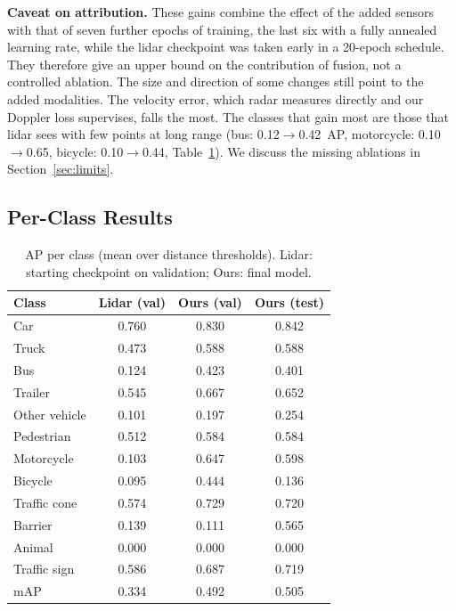 \documentclass[conference]{IEEEtran}
\begin{document}
\textbf{Caveat on attribution.} These gains combine the effect of the added sensors with that of seven further
epochs of training, the last six with a fully annealed learning rate, while the lidar checkpoint was taken early in a
20-epoch schedule. They therefore give an upper bound on the contribution of fusion, not a controlled ablation. The
size and direction of some changes still point to the added modalities. The velocity error, which radar measures
directly and our Doppler loss supervises, falls the most. The classes that gain most are those that lidar sees with
few points at long range (bus: 0.12$\rightarrow$0.42~AP, motorcycle: 0.10$\rightarrow$0.65, bicycle:
0.10$\rightarrow$0.44, Table~\ref{tab:class}). We discuss the missing ablations in Section~\ref{sec:limits}.

\subsection{Per-Class Results}

\begin{table}[t]
\centering
\caption{AP per class (mean over distance thresholds). Lidar: starting checkpoint on validation; Ours: final model.}
\label{tab:class}
\setlength{\tabcolsep}{4pt}
\begin{tabular}{lccc}
\toprule
Class & Lidar (val) & Ours (val) & Ours (test) \\
\midrule
Car            & 0.760 & 0.830 & 0.842 \\
Truck          & 0.473 & 0.588 & 0.588 \\
Bus            & 0.124 & 0.423 & 0.401 \\
Trailer        & 0.545 & 0.667 & 0.652 \\
Other vehicle  & 0.101 & 0.197 & 0.254 \\
Pedestrian     & 0.512 & 0.584 & 0.584 \\
Motorcycle     & 0.103 & 0.647 & 0.598 \\
Bicycle        & 0.095 & 0.444 & 0.136 \\
Traffic cone   & 0.574 & 0.729 & 0.720 \\
Barrier        & 0.139 & 0.111 & 0.565 \\
Animal         & 0.000 & 0.000 & 0.000 \\
Traffic sign   & 0.586 & 0.687 & 0.719 \\
\midrule
mAP            & 0.334 & 0.492 & 0.505 \\
\bottomrule
\end{tabular}
\end{table}
\end{document}
